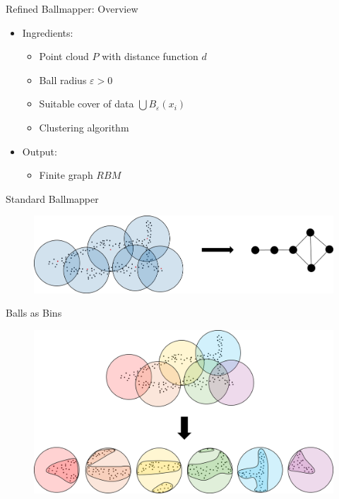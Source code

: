 \documentclass{beamer}
\begin{document}
\begin{frame}{Refined Ballmapper: Overview}
  \begin{itemize}
    \item Ingredients:
    \begin{itemize}
      \item Point cloud $P$ with distance function $d$
      \item Ball radius $\varepsilon > 0$
      \item Suitable cover of data $\bigcup B_\varepsilon(x_i)$
      \item Clustering algorithm
    \end{itemize}
    \item Output:
    \begin{itemize}
      \item Finite graph $RBM$
    \end{itemize}
  \end{itemize}
\end{frame}

\begin{frame}{Standard Ballmapper}
  \begin{figure}
    \begin{center}
      \includegraphics[width=1\textwidth]{prerefined.png}
    \end{center}
  \end{figure}
\end{frame}

\begin{frame}{Balls as Bins}
  \begin{figure}
    \begin{center}
      \hspace*{-.5cm}\includegraphics[width=1.1\textwidth]{ballclustering.png}
    \end{center}
  \end{figure}
\end{frame}
\end{document}
